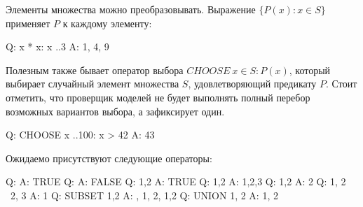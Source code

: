 \documentclass[14pt, openany]{report}
\begin{document}
Элементы множества можно преобразовывать. Выражение \(\{P(x): x \in S\}\) применяет \(P\) к каждому элементу:
\begin{tla}
  Q: {x * x: x ..3}
  A: {1, 4, 9}
\end{tla}
\begin{tlatex}
%
%
\end{tlatex}

Полезным также бывает оператор выбора \(CHOOSE~x \in S: P(x)\), который выбирает случайный элемент множества \(S\), удовлетворяющий предикату \(P\). Стоит отметить, что проверщик моделей не будет выполнять полный перебор возможных вариантов выбора, а зафиксирует один.
\begin{tla}
  Q: CHOOSE x ..100: x > 42
  A: 43
\end{tla} 
\begin{tlatex}
%
%
\end{tlatex}

Ожидаемо присутствуют следующие операторы:
\begin{tla}
  Q: {} \in {{}}
  A: TRUE
  Q: {} \notin {{}}
  A: FALSE
  Q: {1,2} 
  A: TRUE
  Q: {1,2} 
  A: {1,2,3}
  Q: {1,2} 
  A: {2}
  Q: {1, 2} \ {2, 3}
  A: {1}
  Q: SUBSET {1,2}
  A: {{}, {1}, {2}, {1,2}}
  Q: UNION {{1}, {2}}
  A: {1, 2}
\end{tla}
\begin{tlatex}
%
%
%
%
%
%
%
%
%
%
%
%
%
%
%
\end{tlatex}
\end{document}
